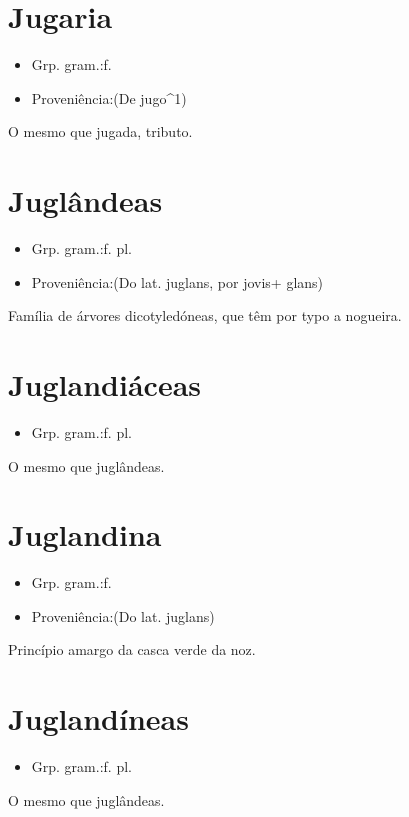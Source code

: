 \documentclass{article}
\begin{document}
\section{Jugaria}
\begin{itemize}
\item {Grp. gram.:f.}
\end{itemize}
\begin{itemize}
\item {Proveniência:(De \textunderscore jugo\textunderscore ^1)}
\end{itemize}
O mesmo que \textunderscore jugada\textunderscore , tributo.
\section{Juglândeas}
\begin{itemize}
\item {Grp. gram.:f. pl.}
\end{itemize}
\begin{itemize}
\item {Proveniência:(Do lat. \textunderscore juglans\textunderscore , por \textunderscore jovis\textunderscore  + \textunderscore glans\textunderscore )}
\end{itemize}
Família de árvores dicotyledóneas, que têm por typo a nogueira.
\section{Juglandiáceas}
\begin{itemize}
\item {Grp. gram.:f. pl.}
\end{itemize}
O mesmo que \textunderscore juglândeas\textunderscore .
\section{Juglandina}
\begin{itemize}
\item {Grp. gram.:f.}
\end{itemize}
\begin{itemize}
\item {Proveniência:(Do lat. \textunderscore juglans\textunderscore )}
\end{itemize}
Princípio amargo da casca verde da noz.
\section{Juglandíneas}
\begin{itemize}
\item {Grp. gram.:f. pl.}
\end{itemize}
O mesmo que \textunderscore juglândeas\textunderscore .
\end{document}
